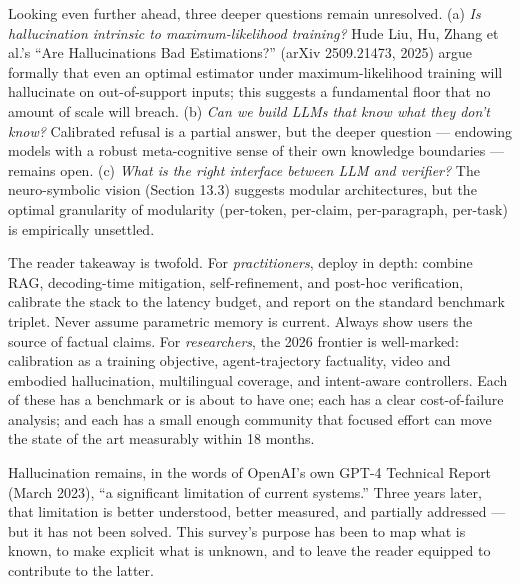 \documentclass{article}
\begin{document}
Looking even further ahead, three deeper questions remain unresolved. (a) \emph{Is hallucination intrinsic to maximum-likelihood training?} Hude Liu, Hu, Zhang et al.'s ``Are Hallucinations Bad Estimations?'' (arXiv 2509.21473, 2025) argue formally that even an optimal estimator under maximum-likelihood training will hallucinate on out-of-support inputs; this suggests a fundamental floor that no amount of scale will breach. (b) \emph{Can we build LLMs that know what they don't know?} Calibrated refusal is a partial answer, but the deeper question --- endowing models with a robust meta-cognitive sense of their own knowledge boundaries --- remains open. (c) \emph{What is the right interface between LLM and verifier?} The neuro-symbolic vision (Section 13.3) suggests modular architectures, but the optimal granularity of modularity (per-token, per-claim, per-paragraph, per-task) is empirically unsettled.

The reader takeaway is twofold. For \emph{practitioners}, deploy in depth: combine RAG, decoding-time mitigation, self-refinement, and post-hoc verification, calibrate the stack to the latency budget, and report on the standard benchmark triplet. Never assume parametric memory is current. Always show users the source of factual claims. For \emph{researchers}, the 2026 frontier is well-marked: calibration as a training objective, agent-trajectory factuality, video and embodied hallucination, multilingual coverage, and intent-aware controllers. Each of these has a benchmark or is about to have one; each has a clear cost-of-failure analysis; and each has a small enough community that focused effort can move the state of the art measurably within 18 months.

Hallucination remains, in the words of OpenAI's own GPT-4 Technical Report (March 2023), ``a significant limitation of current systems.'' Three years later, that limitation is better understood, better measured, and partially addressed --- but it has not been solved. This survey's purpose has been to map what is known, to make explicit what is unknown, and to leave the reader equipped to contribute to the latter.



\end{document}
